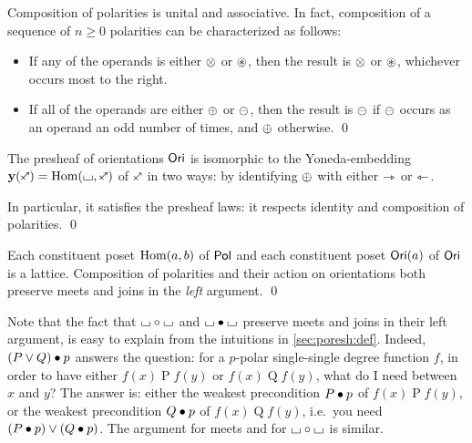 \documentclass[a4paper]{memoir}
\begin{document}
\begin{proposition}
	Composition of polarities is unital and associative.
	In fact, composition of a sequence of $n \geq 0$ polarities can be characterized as follows:
	\begin{itemize}
		\item If any of the operands is either ${\otimes}$ or ${\oast}$, then the result is ${\otimes}$ or ${\oast}$, whichever occurs most to the right.
		\item If all of the operands are either ${\oplus}$ or ${\ominus}$, then the result is ${\ominus}$ if ${\ominus}$ occurs as an operand an odd number of times, and ${\oplus}$ otherwise. \qed
	\end{itemize}
\end{proposition}
\begin{proposition}
	The presheaf of orientations ${\mathsf{Ori}}$ is isomorphic to the Yoneda-embedding $\yoneda(\ypolar) = \Hom(\loch, \ypolar)$ of $\ypolar$ in two ways: by identifying ${\oplus}$ with either ${\rightarrowtriangle}$ or ${\leftarrowtriangle}$. 
	
	In particular, it satisfies the presheaf laws: it respects identity and composition of polarities. \qed
\end{proposition}
\begin{proposition}
	\label{thm:pol-lattice}
	\label{thm:ori-lattice}
	\label{thm:pol-pol-lattice}
	\label{thm:ori-pol-lattice}
	Each constituent poset ${\mathrm{Hom}}(a, b)$ of ${\mathsf{Pol}}$ and each constituent poset ${\mathsf{Ori}}(a)$ of ${\mathsf{Ori}}$ is a lattice.
	Composition of polarities and their action on orientations both preserve meets and joins in the \emph{left} argument. \qed
\end{proposition}
Note that the fact that ${\llcorner\hspace{-.4ex}\lrcorner} \circ {\llcorner\hspace{-.4ex}\lrcorner}$ and ${\llcorner\hspace{-.4ex}\lrcorner} \mathbin{\bullet} {\llcorner\hspace{-.4ex}\lrcorner}$ preserve meets and joins in their left argument, is easy to explain from the intuitions in \cref{sec:poresh:def}.
Indeed, $(P \vee Q) \mathbin{\bullet} p$ answers the question: for a $p$-polar single-single degree function $f$, in order to have either $f(x) \mathrel{P} f(y)$ or $f(x) \mathrel{Q} f(y)$, what do I need between $x$ and $y$?
The answer is: either the weakest precondition $P \mathbin{\bullet} p$ of $f(x) \mathrel{P} f(y)$, or the weakest precondition $Q \mathbin{\bullet} p$ of $f(x) \mathrel{Q} f(y)$, i.e.\ you need $(P \mathbin{\bullet} p) \vee (Q \mathbin{\bullet} p)$.
The argument for meets and for ${\llcorner\hspace{-.4ex}\lrcorner} \circ {\llcorner\hspace{-.4ex}\lrcorner}$ is similar.
\end{document}
